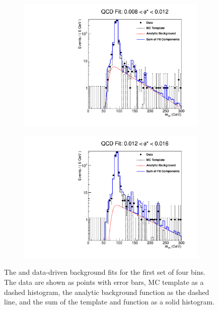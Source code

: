 \begin{figure}[!htbp]
\begin{subfigure}[b]{\SideBySidePlotWidth}
        \caption{}
        \label{fig:qcd_fit_02}
    \end{subfigure}
    \begin{subfigure}[b]{\SideBySidePlotWidth}
        \includegraphics[width=\linewidth]{figures/qcd_fits/qcd_fit_plot_for_03.pdf}
        \caption{}
        \label{fig:qcd_fit_03}
    \end{subfigure}%
    \begin{subfigure}[b]{\SideBySidePlotWidth}
        \includegraphics[width=\linewidth]{figures/qcd_fits/qcd_fit_plot_for_04.pdf}
        \caption{}
        \label{fig:qcd_fit_04}
    \end{subfigure}
    \caption[
       The \QCDjets and \wjets data-driven background fits for the first set of
       four \phistar bins.
    ]{
       The \QCDjets and \wjets data-driven background fits for the first set of
       four \phistar bins. The data are shown as points with error bars, MC
       template as a dashed histogram, the analytic background function as the
       dashed line, and the sum of the template and function as a solid
       histogram.
    }
    \label{fig:qcd_many_1}
\end{figure}


